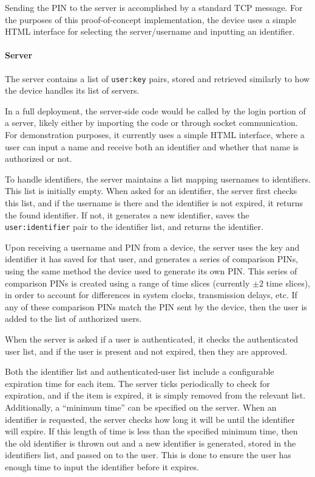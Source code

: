\documentclass[11pt]{article}
\begin{document}
Sending the PIN to the server is accomplished by a standard TCP message.
For the purposes of this proof-of-concept implementation, the device
uses a simple HTML interface for selecting the server/username and
inputting an identifier.



\paragraph{Server}
The server contains a list of \texttt{user:key} pairs, stored and
retrieved similarly to how the device handles its list of servers.

In a full deployment, the server-side code would be called by the login
portion of a server, likely either by importing the code or through
socket communication. For demonstration purposes, it currently uses a
simple HTML interface, where a user can input a name and receive both an
identifier and whether that name is authorized or not.

To handle identifiers, the server maintains a list mapping usernames to
identifiers. This list is initially empty. When asked for an identifier,
the server first checks this list, and if the username is there and the
identifier is not expired, it returns the found identifier. If not, it
generates a new identifier, saves the \texttt{user:identifier} pair to
the identifier list, and returns the identifier.

Upon receiving a username and PIN from a device, the server uses the key
and identifier it has saved for that user, and generates a series of
comparison PINs, using the same method the device used to generate its
own PIN. This series of comparison PINs is created using a range of time
slices (currently $\pm2$ time slices), in order to account for
differences in system clocks, transmission delays, etc. If any of these
comparison PINs match the PIN sent by the device, then the user is added
to the list of authorized users.

When the server is asked if a user is authenticated, it checks the
authenticated user list, and if the user is present and not expired,
then they are approved.

Both the identifier list and authenticated-user list include a
configurable expiration time for each item. The server ticks
periodically to check for expiration, and if the item is expired, it is
simply removed from the relevant list. Additionally, a ``minimum time''
can be specified on the server. When an identifier is requested, the
server checks how long it will be until the identifier will expire. If
this length of time is less than the specified minimum time, then the
old identifier is thrown out and a new identifier is generated, stored
in the identifiers list, and passed on to the user. This is done to
ensure the user has enough time to input the identifier before it
expires.
\end{document}
